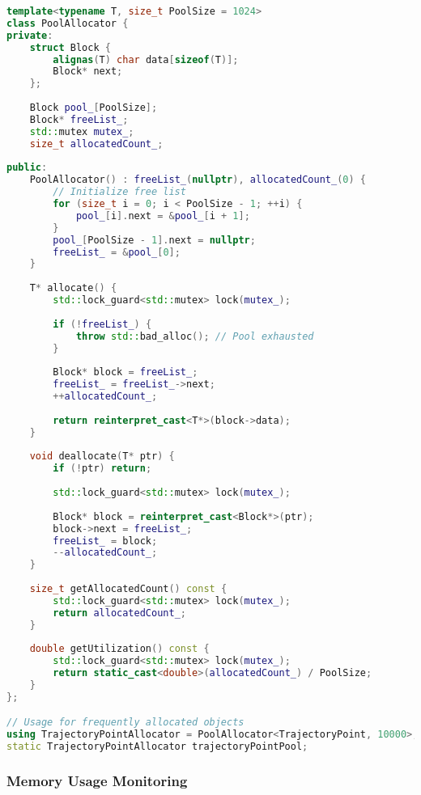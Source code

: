 \begin{lstlisting}[language=C++, caption=Pool Allocator for Frequent Allocations]
template<typename T, size_t PoolSize = 1024>
class PoolAllocator {
private:
    struct Block {
        alignas(T) char data[sizeof(T)];
        Block* next;
    };
    
    Block pool_[PoolSize];
    Block* freeList_;
    std::mutex mutex_;
    size_t allocatedCount_;
    
public:
    PoolAllocator() : freeList_(nullptr), allocatedCount_(0) {
        // Initialize free list
        for (size_t i = 0; i < PoolSize - 1; ++i) {
            pool_[i].next = &pool_[i + 1];
        }
        pool_[PoolSize - 1].next = nullptr;
        freeList_ = &pool_[0];
    }
    
    T* allocate() {
        std::lock_guard<std::mutex> lock(mutex_);
        
        if (!freeList_) {
            throw std::bad_alloc(); // Pool exhausted
        }
        
        Block* block = freeList_;
        freeList_ = freeList_->next;
        ++allocatedCount_;
        
        return reinterpret_cast<T*>(block->data);
    }
    
    void deallocate(T* ptr) {
        if (!ptr) return;
        
        std::lock_guard<std::mutex> lock(mutex_);
        
        Block* block = reinterpret_cast<Block*>(ptr);
        block->next = freeList_;
        freeList_ = block;
        --allocatedCount_;
    }
    
    size_t getAllocatedCount() const {
        std::lock_guard<std::mutex> lock(mutex_);
        return allocatedCount_;
    }
    
    double getUtilization() const {
        std::lock_guard<std::mutex> lock(mutex_);
        return static_cast<double>(allocatedCount_) / PoolSize;
    }
};

// Usage for frequently allocated objects
using TrajectoryPointAllocator = PoolAllocator<TrajectoryPoint, 10000>;
static TrajectoryPointAllocator trajectoryPointPool;
\end{lstlisting}

\subsubsection{Memory Usage Monitoring}

